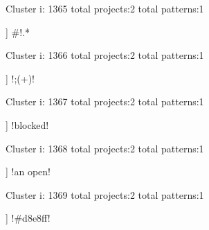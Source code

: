 Cluster i: 1365
total projects:2
total patterns:1
\begin{multicols}{1}
\begin{description}[noitemsep,topsep=0pt]
\item [[2] ] \cverb@#!.*\n@
\end{description}
\end{multicols}







Cluster i: 1366
total projects:2
total patterns:1
\begin{multicols}{1}
\begin{description}[noitemsep,topsep=0pt]
\item [[2] ] \cverb!;(\s+)!
\end{description}
\end{multicols}







Cluster i: 1367
total projects:2
total patterns:1
\begin{multicols}{1}
\begin{description}[noitemsep,topsep=0pt]
\item [[2] ] \cverb!blocked!
\end{description}
\end{multicols}







Cluster i: 1368
total projects:2
total patterns:1
\begin{multicols}{1}
\begin{description}[noitemsep,topsep=0pt]
\item [[2] ] \cverb!an open!
\end{description}
\end{multicols}







Cluster i: 1369
total projects:2
total patterns:1
\begin{multicols}{1}
\begin{description}[noitemsep,topsep=0pt]
\item [[2] ] \cverb!#d8e8ff!
\end{description}
\end{multicols}







